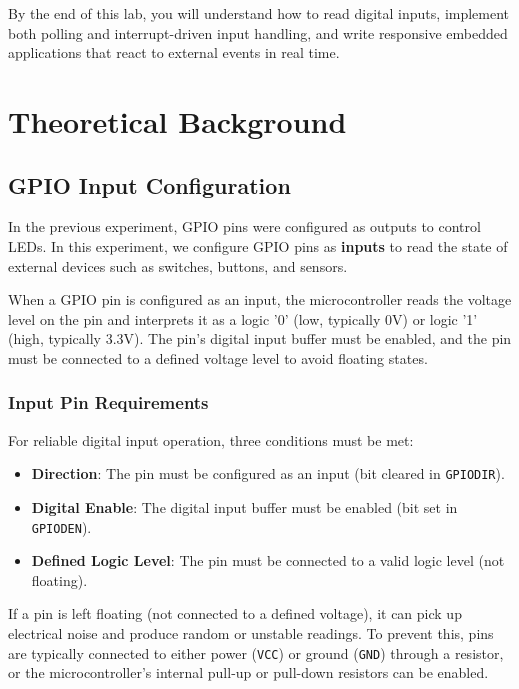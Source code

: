 By the end of this lab, you will understand how to read digital inputs, implement both polling and interrupt-driven input handling, and write responsive embedded applications that react to external events in real time.

\newpage
{}
\localtableofcontents
\bigskip
\newpage

\section{Theoretical Background}

\subsection{GPIO Input Configuration}

In the previous experiment, GPIO pins were configured as outputs to control LEDs. In this experiment, we configure GPIO pins as \textbf{inputs} to read the state of external devices such as switches, buttons, and sensors.

When a GPIO pin is configured as an input, the microcontroller reads the voltage level on the pin and interprets it as a logic '0' (low, typically 0V) or logic '1' (high, typically 3.3V). The pin's digital input buffer must be enabled, and the pin must be connected to a defined voltage level to avoid floating states.

\subsubsection{Input Pin Requirements}

For reliable digital input operation, three conditions must be met:
\begin{itemize}[nosep]
  \item \textbf{Direction}: The pin must be configured as an input (bit cleared in \texttt{GPIODIR}).
  \item \textbf{Digital Enable}: The digital input buffer must be enabled (bit set in \texttt{GPIODEN}).
  \item \textbf{Defined Logic Level}: The pin must be connected to a valid logic level (not floating).
\end{itemize}

\noindent
If a pin is left floating (not connected to a defined voltage), it can pick up electrical noise and produce random or unstable readings. To prevent this, pins are typically connected to either power (\texttt{VCC}) or ground (\texttt{GND}) through a resistor, or the microcontroller's internal pull-up or pull-down resistors can be enabled.

